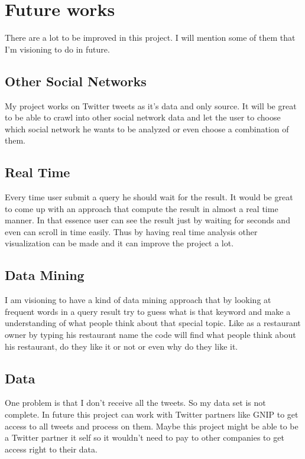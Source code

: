 \documentclass[a4paper,11pt]{report}
\begin{document}
\section{Future works}
There are a lot to be improved in this project. I will mention some of them that I'm visioning to do in future.

\subsection{Other Social Networks}
My project works on Twitter tweets as it's data and only source. It will be great to be able to crawl into other social network data and let the user to choose which social network he wants to be analyzed or even choose a combination of them.

\subsection{Real Time}
Every time user submit a query he should wait for the result. It would be great to come up with an approach that compute the result in almost a real time manner. In that essence user can see the result just by waiting for seconds and even can scroll in time easily. Thus by having real time analysis other visualization can be made and it can improve the project a lot.

\subsection{Data Mining}
I am visioning to have a kind of data mining approach that by looking at frequent words in a query result try to guess what is that keyword and make a understanding of what people think about that special topic. Like as a restaurant owner by typing his restaurant name the code will find what people think about his restaurant, do they like it or not or even why do they like it.

\subsection{Data}
One problem is that I don't receive all the tweets. So my data set is not complete. In future this project can work with Twitter partners like GNIP to get access to all tweets and process on them. Maybe this project might be able to be a Twitter partner it self so it wouldn't need to pay to other companies to get access right to their data.

\listoffigures
\end{document}

